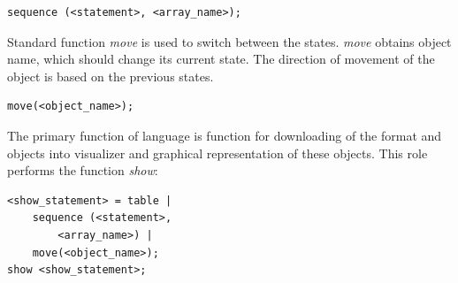 \documentclass[a4paper, 10pt, conference]{ieeeconf}
\begin{document}
\begin{lstlisting}
sequence (<statement>, <array_name>);
\end{lstlisting}
Standard function \textit{move} is used to switch between the states. \textit{move} obtains object name, which should change its current state. The direction of movement of the object is based on the previous states.
\begin{lstlisting}
move(<object_name>);
\end{lstlisting}
The primary function of language is function for downloading of the format and objects into visualizer and graphical representation of these objects. This role performs the function \textit{show}:
\begin{lstlisting}
<show_statement> = table |
	sequence (<statement>,
		<array_name>) |
	move(<object_name>);
show <show_statement>;
\end{lstlisting}
\end{document}
